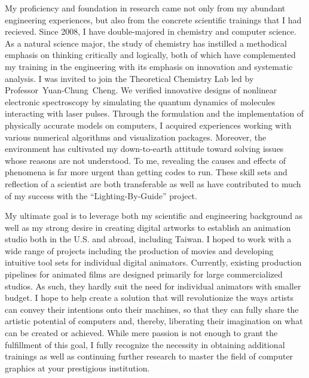 \documentclass[a4paper, 11pt]{article}
\begin{document}
My proficiency and foundation in research came not only from my abundant engineering experiences, but also from the concrete scientific trainings that I had recieved. Since 2008, I have double-majored in chemistry and computer science. As a natural science major, the study of chemistry has instilled a methodical emphasis on thinking critically and logically, both of which have complemented my training in the engineering with its emphasis on innovation and systematic analysis. I was invited to join the Theoretical Chemistry Lab led by \mbox{Professor~Yuan-Chung~Cheng}. We verified innovative designs of nonlinear electronic spectroscopy by simulating the quantum dynamics of molecules interacting with laser pulses. Through the formulation and the implementation of physically accurate models on computers, I acquired experiences working with various numerical algorithms and visualization packages. Moreover, the environment has cultivated my down-to-earth attitude toward solving issues whose reasons are not understood. To me, revealing the causes and effects of phenomena is far more urgent than getting codes to run. These skill sets and reflection of a scientist are both transferable as well as have contributed to much of my success with the ``Lighting-By-Guide'' project. 



My ultimate goal is to leverage both my scientific and engineering background as well as my strong desire in creating digital artworks to establish an animation studio both in the U.S. and abroad, including Taiwan. I hoped to work with a wide range of projects including the production of movies and developing intuitive tool sets for individual digital animators. Currently, existing production pipelines for animated films are designed primarily for large commercialized studios. As such, they hardly suit the need for individual animators with smaller budget. I hope to help create a solution that will revolutionize the ways artists can convey their intentions onto their machines, so that they can fully share the artistic potential of computers and, thereby, liberating their imagination on what can be created or achieved. While mere passion is not enough to grant the fulfillment of this goal, I fully recognize the necessity in obtaining additional trainings as well as continuing further research to master the field of computer graphics at your prestigious institution.
\end{document}
